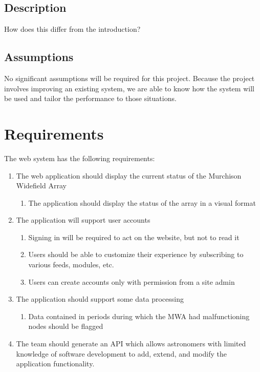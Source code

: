 \documentclass[12pt]{article}
\begin{document}
\begin{spacing}{1.5}
\subsection{Description}
How does this differ from the introduction?

\subsection{Assumptions}
No significant assumptions will be required for this project. Because the project involves improving an existing system, we are able to know how the system will be used and tailor the performance to those situations.

\newpage

\section{Requirements}
The web system has the following requirements:
\begin{enumerate}
\item The web application should display the current status of the Murchison Widefield Array
	\begin{enumerate}
	\item The application should display the status of the array in a visual format
	\end{enumerate}
\item The application will support user accounts
	\begin{enumerate}
	\item Signing in will be required to act on the website, but not to read it
	\item Users should be able to customize their experience by subscribing to various feeds, modules, etc.
	\item Users can create accounts only with permission from a site admin
	\end{enumerate}
\item The application should support some data processing
	\begin{enumerate}
	\item Data contained in periods during which the MWA had malfunctioning nodes should be flagged
	\end{enumerate}
\item The team should generate an API which allows astronomers with limited knowledge of software development to add, extend, and modify the application functionality.
\end{enumerate}


\end{spacing}
\end{document}
